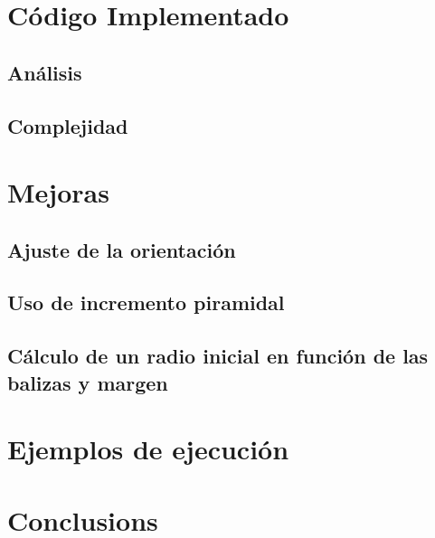 


\section{Código Implementado}

\subsection{Análisis}

\subsection{Complejidad}


\section{Mejoras}

\subsection{Ajuste de la orientación}
\subsection{Uso de incremento piramidal}
\subsection{Cálculo de un radio inicial en función de las balizas y margen}

\section{Ejemplos de ejecución}

\section{Conclusions}
